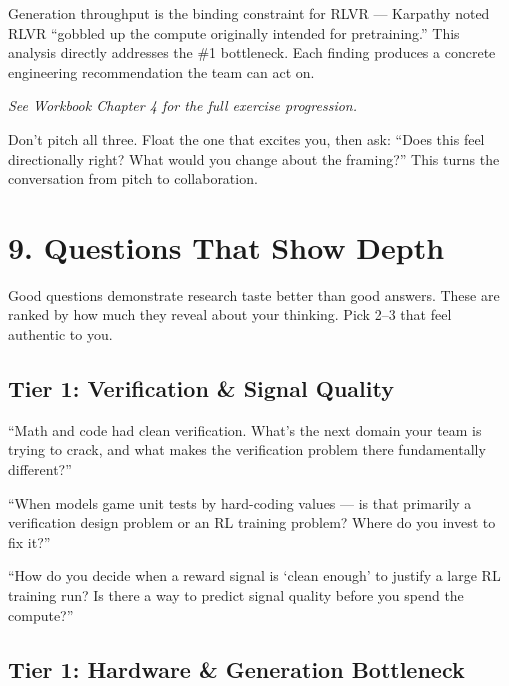 \begin{whyanthro}
Generation throughput is the binding constraint for RLVR --- Karpathy noted RLVR ``gobbled up the compute originally intended for pretraining.'' This analysis directly addresses the \#1 bottleneck. Each finding produces a concrete engineering recommendation the team can act on.
\end{whyanthro}

\smallskip\noindent\textit{See Workbook Chapter 4 for the full exercise progression.}

\begin{whyanthro}
Don't pitch all three. Float the one that excites you, then ask: ``Does this feel directionally right? What would you change about the framing?'' This turns the conversation from pitch to collaboration.
\end{whyanthro}

\section{9. Questions That Show Depth}

\begin{bluf}
Good questions demonstrate research taste better than good answers. These are ranked by how much they reveal about your thinking. Pick 2--3 that feel authentic to you.
\end{bluf}

\subsection{Tier 1: Verification \& Signal Quality}

``Math and code had clean verification. What's the next domain your team is trying to crack, and what makes the verification problem there fundamentally different?''

``When models game unit tests by hard-coding values --- is that primarily a verification design problem or an RL training problem? Where do you invest to fix it?''

``How do you decide when a reward signal is `clean enough' to justify a large RL training run? Is there a way to predict signal quality before you spend the compute?''

\subsection{Tier 1: Hardware \& Generation Bottleneck}

